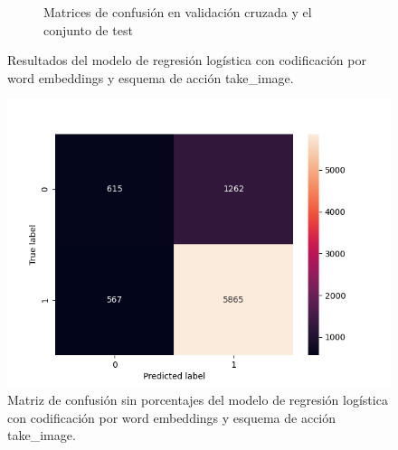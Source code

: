 \begin{figure}
\begin{subfigure}[b]{\textwidth}
    \endminipage
    \caption{Matrices de confusión en validación cruzada y el conjunto de test}
    \end{subfigure}
    \caption{Resultados del modelo de regresión logística con codificación por word embeddings y esquema de acción take\_image.}
\end{figure}


\begin{figure}
    \centering
    \includegraphics[scale=0.7]{figures/results/word_embeddings/lgr/take_image/lgr_set_6_confusion_matrix_raw.png}
    \caption{Matriz de confusión sin porcentajes del modelo de regresión logística con codificación por word embeddings y esquema de acción take\_image.}
    \label{fig:my_label}
\end{figure}

\begin{table}[h!]
\centering
{}
 \caption{Resultados por esquema de acción del mejor modelo con codificación por word embeddings.}
 \label{results:ad-hoc-calibrate}
\end{table}


